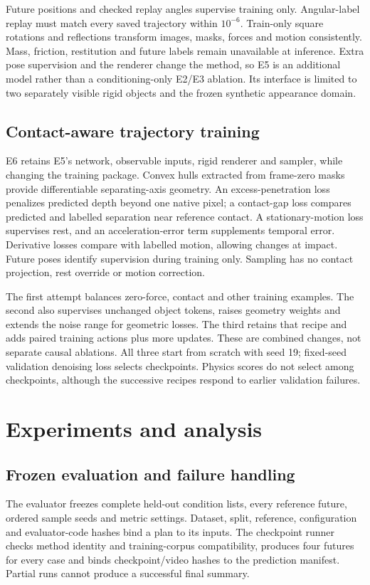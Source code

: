 \documentclass[11pt,a4paper]{article}
\begin{document}
Future positions and checked replay angles supervise training only. Angular-label replay must match every saved trajectory within $10^{-6}$. Train-only square rotations and reflections transform images, masks, forces and motion consistently. Mass, friction, restitution and future labels remain unavailable at inference. Extra pose supervision and the renderer change the method, so E5 is an additional model rather than a conditioning-only E2/E3 ablation. Its interface is limited to two separately visible rigid objects and the frozen synthetic appearance domain.

\subsection{Contact-aware trajectory training}
E6 retains E5's network, observable inputs, rigid renderer and sampler, while changing the training package. Convex hulls extracted from frame-zero masks provide differentiable separating-axis geometry. An excess-penetration loss penalizes predicted depth beyond one native pixel; a contact-gap loss compares predicted and labelled separation near reference contact. A stationary-motion loss supervises rest, and an acceleration-error term supplements temporal error. Derivative losses compare with labelled motion, allowing changes at impact. Future poses identify supervision during training only. Sampling has no contact projection, rest override or motion correction.

The first attempt balances zero-force, contact and other training examples. The second also supervises unchanged object tokens, raises geometry weights and extends the noise range for geometric losses. The third retains that recipe and adds paired training actions plus more updates. These are combined changes, not separate causal ablations. All three start from scratch with seed 19; fixed-seed validation denoising loss selects checkpoints. Physics scores do not select among checkpoints, although the successive recipes respond to earlier validation failures.

\section{Experiments and analysis}
\subsection{Frozen evaluation and failure handling}
The evaluator freezes complete held-out condition lists, every reference future, ordered sample seeds and metric settings. Dataset, split, reference, configuration and evaluator-code hashes bind a plan to its inputs. The checkpoint runner checks method identity and training-corpus compatibility, produces four futures for every case and binds checkpoint/video hashes to the prediction manifest. Partial runs cannot produce a successful final summary.
\end{document}
